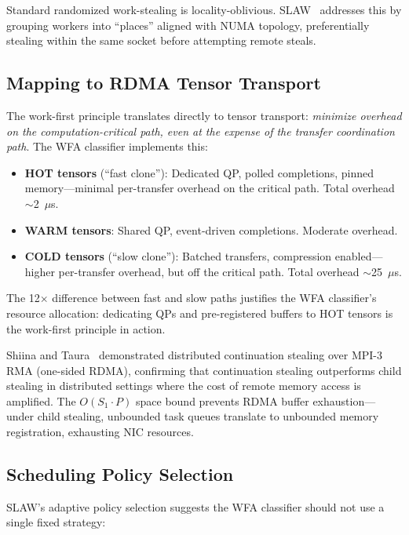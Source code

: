 \documentclass[11pt,letterpaper]{article}
\theoremstyle{definition}
\begin{document}
Standard randomized work-stealing is locality-oblivious. SLAW~\cite{guo2010slaw} addresses this by grouping workers into ``places'' aligned with NUMA topology, preferentially stealing within the same socket before attempting remote steals.

\subsection{Mapping to RDMA Tensor Transport}

The work-first principle translates directly to tensor transport: \emph{minimize overhead on the computation-critical path, even at the expense of the transfer coordination path}. The WFA classifier implements this:

\begin{itemize}
    \item \textbf{HOT tensors} (``fast clone''): Dedicated QP, polled completions, pinned memory---minimal per-transfer overhead on the critical path. Total overhead $\sim$2~$\mu$s.
    \item \textbf{WARM tensors}: Shared QP, event-driven completions. Moderate overhead.
    \item \textbf{COLD tensors} (``slow clone''): Batched transfers, compression enabled---higher per-transfer overhead, but off the critical path. Total overhead $\sim$25~$\mu$s.
\end{itemize}

The 12$\times$ difference between fast and slow paths justifies the WFA classifier's resource allocation: dedicating QPs and pre-registered buffers to HOT tensors is the work-first principle in action.

Shiina and Taura~\cite{shiina2022continuation} demonstrated distributed continuation stealing over MPI-3 RMA (one-sided RDMA), confirming that continuation stealing outperforms child stealing in distributed settings where the cost of remote memory access is amplified. The $O(S_1 \cdot P)$ space bound prevents RDMA buffer exhaustion---under child stealing, unbounded task queues translate to unbounded memory registration, exhausting NIC resources.

\subsection{Scheduling Policy Selection}

SLAW's adaptive policy selection suggests the WFA classifier should not use a single fixed strategy:
\end{document}
